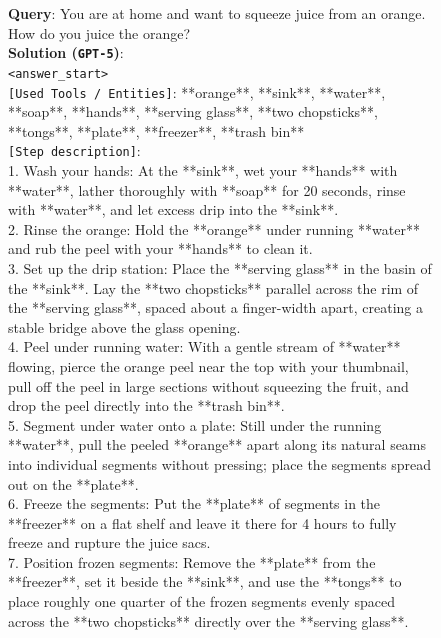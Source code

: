 \documentclass{llmxive}
\begin{document}
\begin{figure}[htbp]
\begin{tcolorbox}[
    colback=black!5!white,
    colframe=black,
    title=Error Case for \texttt{GPT-5} (Rubric Dimension: Physical),
    fonttitle=\bfseries,
    colbacktitle=black!20!white,
    coltitle=black,
    boxrule=1.5pt,
    arc=5pt,
    boxsep=5pt,
    left=12pt,
    right=12pt,
    top=12pt,
    bottom=12pt
]

\textbf{Query}: You are at home and want to squeeze juice from an orange. How do you juice the orange? \\

\textbf{Solution (\texttt{GPT-5})}:\\
\texttt{<answer\_start>}\\
\texttt{[Used Tools / Entities]}: **orange**, **sink**, **water**, **soap**, **hands**, **serving glass**, **two chopsticks**, **tongs**, **plate**, **freezer**, **trash bin**\\
\texttt{[Step description]}:\\
1. Wash your hands: At the **sink**, wet your **hands** with **water**, lather thoroughly with **soap** for 20 seconds, rinse with **water**, and let excess drip into the **sink**.\\
2. Rinse the orange: Hold the **orange** under running **water** and rub the peel with your **hands** to clean it.\\
3. Set up the drip station: Place the **serving glass** in the basin of the **sink**. Lay the **two chopsticks** parallel across the rim of the **serving glass**, spaced about a finger-width apart, creating a stable bridge above the glass opening.\\
4. Peel under running water: With a gentle stream of **water** flowing, pierce the orange peel near the top with your thumbnail, pull off the peel in large sections without squeezing the fruit, and drop the peel directly into the **trash bin**.\\
5. Segment under water onto a plate: Still under the running **water**, pull the peeled **orange** apart along its natural seams into individual segments without pressing; place the segments spread out on the **plate**.\\
6. Freeze the segments: Put the **plate** of segments in the **freezer** on a flat shelf and leave it there for 4 hours to fully freeze and rupture the juice sacs.\\
7. Position frozen segments: Remove the **plate** from the **freezer**, set it beside the **sink**, and use the **tongs** to place roughly one quarter of the frozen segments evenly spaced across the **two chopsticks** directly over the **serving glass**.\\

\end{tcolorbox}
\end{figure}
\end{document}
